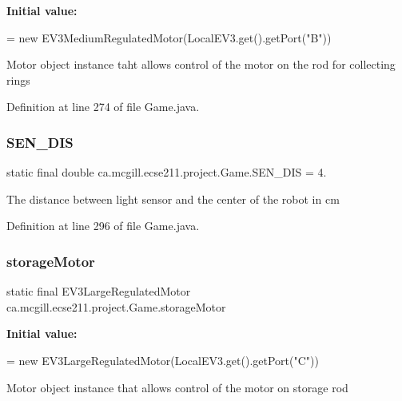 {\bfseries Initial value\+:}
\begin{DoxyCode}
=
      \textcolor{keyword}{new} EV3MediumRegulatedMotor(LocalEV3.get().getPort(\textcolor{stringliteral}{"B"}))
\end{DoxyCode}
Motor object instance taht allows control of the motor on the rod for collecting rings 

Definition at line 274 of file Game.\+java.

\mbox{\label{enumca_1_1mcgill_1_1ecse211_1_1project_1_1_game_ab940d1a52b9759294dc0229e0fd6bc06}} 
\subsubsection{\texorpdfstring{S\+E\+N\+\_\+\+D\+IS}{SEN\_DIS}}
{\footnotesize\ttfamily  static  final double ca.\+mcgill.\+ecse211.\+project.\+Game.\+S\+E\+N\+\_\+\+D\+IS = 4.\hspace{0.3cm}{\ttfamily [static]}}

The distance between light sensor and the center of the robot in cm 

Definition at line 296 of file Game.\+java.

\mbox{\label{enumca_1_1mcgill_1_1ecse211_1_1project_1_1_game_af3ba5407b115e9c6e07dffda576f29b7}} 
\subsubsection{\texorpdfstring{storage\+Motor}{storageMotor}}
{\footnotesize\ttfamily  static  final E\+V3\+Large\+Regulated\+Motor ca.\+mcgill.\+ecse211.\+project.\+Game.\+storage\+Motor\hspace{0.3cm}{\ttfamily [static]}}

{\bfseries Initial value\+:}
\begin{DoxyCode}
=
      \textcolor{keyword}{new} EV3LargeRegulatedMotor(LocalEV3.get().getPort(\textcolor{stringliteral}{"C"}))
\end{DoxyCode}
Motor object instance that allows control of the motor on storage rod 

